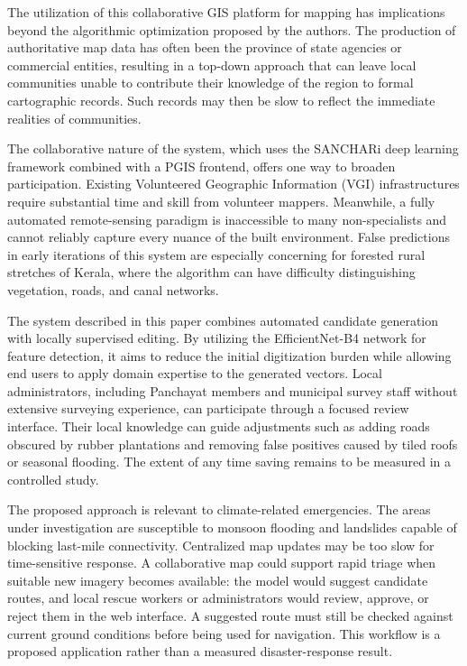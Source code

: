 \documentclass[10pt,a4paper,twocolumn]{article}
\begin{document}
The utilization of this collaborative GIS platform for mapping has implications beyond the algorithmic optimization proposed by the authors. The production of authoritative map data has often been the province of state agencies or commercial entities, resulting in a top-down approach that can leave local communities unable to contribute their knowledge of the region to formal cartographic records. Such records may then be slow to reflect the immediate realities of communities.

The collaborative nature of the system, which uses the SANCHARi deep learning framework combined with a PGIS frontend, offers one way to broaden participation. Existing Volunteered Geographic Information (VGI) infrastructures require substantial time and skill from volunteer mappers. Meanwhile, a fully automated remote-sensing paradigm is inaccessible to many non-specialists and cannot reliably capture every nuance of the built environment. False predictions in early iterations of this system are especially concerning for forested rural stretches of Kerala, where the algorithm can have difficulty distinguishing vegetation, roads, and canal networks.

The system described in this paper combines automated candidate generation with locally supervised editing. By utilizing the EfficientNet-B4 network for feature detection, it aims to reduce the initial digitization burden while allowing end users to apply domain expertise to the generated vectors. Local administrators, including Panchayat members and municipal survey staff without extensive surveying experience, can participate through a focused review interface. Their local knowledge can guide adjustments such as adding roads obscured by rubber plantations and removing false positives caused by tiled roofs or seasonal flooding. The extent of any time saving remains to be measured in a controlled study.

The proposed approach is relevant to climate-related emergencies. The areas under investigation are susceptible to monsoon flooding and landslides capable of blocking last-mile connectivity. Centralized map updates may be too slow for time-sensitive response. A collaborative map could support rapid triage when suitable new imagery becomes available: the model would suggest candidate routes, and local rescue workers or administrators would review, approve, or reject them in the web interface. A suggested route must still be checked against current ground conditions before being used for navigation. This workflow is a proposed application rather than a measured disaster-response result.
\end{document}
